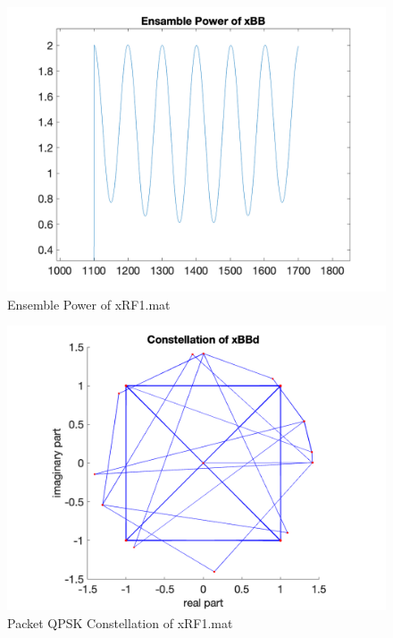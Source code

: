 \begin{figure}[h!]
    \centering
    \includegraphics[scale=0.5]{figures/ensemble_power.png}
    \caption{Ensemble Power of xRF1.mat}
    \label{fig:ensemble-power}
\end{figure}
\begin{figure}[h!]
    \centering
    \includegraphics[scale=0.5]{figures/packet_qpsk_constellation.png}
    \caption{Packet QPSK Constellation of xRF1.mat}
    \label{fig:parti-packet-constellation}
\end{figure}
